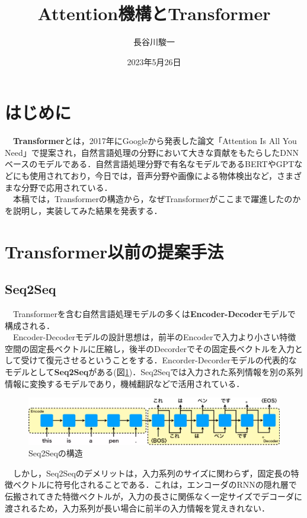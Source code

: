 \documentclass[a4j, 11pt]{jsarticle}
\title{Attention機構とTransformer}
\author{長谷川駿一}
\date{2023年5月26日 }
\numberwithin{equation}{section}
\begin{document}
\maketitle
\section{はじめに}
　\textbf{Transformer}とは，2017年にGoogleから発表した論文「Attention Is All You Need」\cite{all}で提案され，自然言語処理の分野において大きな貢献をもたらしたDNNベースのモデルである．自然言語処理分野で有名なモデルであるBERTやGPTなどにも使用されており，今日では，音声分野や画像による物体検出など，さまざまな分野で応用されている．\\
　本稿では，Transformerの構造から，なぜTransformerがここまで躍進したのかを説明し，実装してみた結果を発表する．\\

\section{Transformer以前の提案手法}
\subsection{Seq2Seq}
　Transformerを含む自然言語処理モデルの多くは\textbf{Encoder-Decoder}モデルで構成される．\\
　Encoder-Decoderモデルの設計思想は，前半のEncoderで入力より小さい特徴空間の固定長ベクトルに圧縮し，後半のDecorderでその固定長ベクトルを入力として受けて復元させるということをする．Encorder-Decorderモデルの代表的なモデルとして\textbf{Seq2Seq}がある(図\ref{seq2_model})．Seq2Seqでは入力された系列情報を別の系列情報に変換するモデルであり，機械翻訳などで活用されている．\\
\begin{figure}[H]
\centering
\includegraphics[scale=0.5]{seq2seq_model.png}
\caption{Seq2Seqの構造}
\label{seq2_model}
\end{figure}
\newpage
　しかし，Seq2Seqのデメリットは，入力系列のサイズに関わらず，固定長の特徴ベクトルに符号化されることである．これは，エンコーダのRNNの隠れ層で伝搬されてきた特徴ベクトルが，入力の長さに関係なく一定サイズでデコーダに渡されるため，入力系列が長い場合に前半の入力情報を覚えきれない．\\
\end{document}
